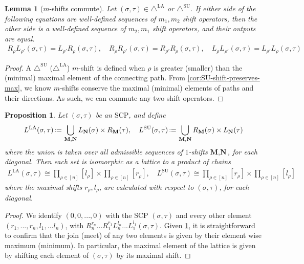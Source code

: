 \documentclass{amsart}
\newtheorem{proposition}[theorem]{Proposition}
\newtheorem{lemma}[theorem]{Lemma}
\theoremstyle{definition}
\newcommand{\eqdef}{\mbox{\,\raisebox{0.2ex}{\scriptsize\ensuremath{\mathrm:}}\ensuremath{=}\,}} %
\newcommand{\SU}{\mathrm{SU}}
\newcommand{\LA}{\mathrm{LA}}
\newcommand{\SUD}{\triangle^{\mathrm{SU}}}
\newcommand{\LAD}{\triangle^{\mathrm{LA}}}
\newcommand{\SCP}{\mathrm{SCP}}
\begin{document}
\begin{lemma}[$m$-shifts commute] \label{lem:m-shifts commute}
Let $(\sigma,\tau) \in \LAD$ or $\SUD$.
If either side of the following equations are  well-defined sequences of $m_1,m_2$ shift operators, then the other side is a well-defined sequence of $m_2,m_1$ shift operators, and their outputs are equal.
\begin{align*}
    R_{\rho} L_{\rho'}(\sigma,\tau) = L_{\rho'} R_{\rho}(\sigma,\tau), \quad R_{\rho} R_{\rho'}(\sigma,\tau) = R_{\rho'} R_{\rho}(\sigma,\tau), \quad L_{\rho} L_{\rho'}(\sigma,\tau) = L_{\rho'} L_{\rho}(\sigma,\tau)
\end{align*}
\end{lemma}
\begin{proof}
A $\SUD$ ($\LAD$) $m$-shift is defined when $\rho$ is greater (smaller) than the (minimal) maximal element of the connecting path.
From \cref{cor:SU-shift-preserves-max}, we know $m$-shifts conserve the maximal (minimal) elements of paths and their directions.
As such, we can commute any two shift operators.
\end{proof}

\begin{proposition} \label{prop:shift lattice}
Let $(\sigma,\tau)$ be an $\SCP$, and define
\begin{align*}
    L^{\LA}(\sigma,\tau) \eqdef \bigcup_{\mathbf{M}, \mathbf{N}} L_\mathbf{N}(\sigma)\times R_\mathbf{M}(\tau), \quad L^{\SU}(\sigma,\tau) \eqdef \bigcup_{\mathbf{M}, \mathbf{N}} R_\mathbf{M}(\sigma)\times L_\mathbf{N}(\tau)
\end{align*}
where the union is taken over all admissible sequences of $1$-shifts $\textbf{M},\textbf{N}$, for each diagonal.
Then each set is isomorphic as a lattice to a product of chains
\begin{align*}
    L^{\LA}(\sigma,\tau) \cong \prod_{\rho \in [n]} [l_\rho]
    \times \prod_{\rho \in [n]} [r_\rho], \quad L^{\SU}(\sigma,\tau) \cong \prod_{\rho \in [n]} [r_\rho]
    \times \prod_{\rho \in [n]} [l_\rho]
\end{align*}
where the maximal shifts $r_\rho,l_\rho$, are calculated with respect to $(\sigma,\tau)$, for each diagonal.
\end{proposition}

\begin{proof}

We identify $(0,0,...,0)$ with the SCP $(\sigma,\tau)$ and every other element $(r_1,...,r_n,l_1,...l_n)$, with 
$R^{r_n}_{n}...R^{r_{1}}_{1}
L^{l_n}_{n}...L^{l_{1}}_{1}(\sigma,\tau)$.
Given \cref{lem:m-shifts commute}, it is straightforward to confirm that the join (meet) of any two elements is given by their element wise maximum (minimum).
In particular, the maximal element of the lattice is given by shifting each element of $(\sigma,\tau)$ by its maximal shift.
\end{proof}
\end{document}
